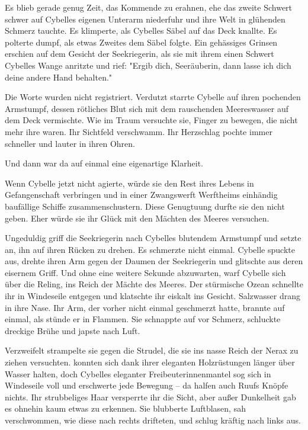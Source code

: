 Es blieb gerade genug Zeit, das Kommende zu erahnen, ehe das zweite Schwert schwer auf Cybelles eigenen Unterarm niederfuhr und ihre Welt in glühenden Schmerz tauchte. Es klimperte, als Cybelles Säbel auf das Deck knallte. Es polterte dumpf, als etwas Zweites dem Säbel folgte. Ein gehässiges Grinsen erschien auf dem Gesicht der Seekriegerin, als sie mit ihrem einen Schwert Cybelles Wange anritzte und rief: "Ergib dich, Seeräuberin, dann lasse ich dich deine andere Hand behalten."

Die Worte wurden nicht registriert. Verdutzt starrte Cybelle auf ihren pochenden Armstumpf, dessen rötliches Blut sich mit dem rauschenden Meereswasser auf dem Deck vermischte. Wie im Traum versuchte sie, Finger zu bewegen, die nicht mehr ihre waren. Ihr Sichtfeld verschwamm. Ihr Herzschlag pochte immer schneller und lauter in ihren Ohren.

Und dann war da auf einmal eine eigenartige Klarheit. 

Wenn Cybelle jetzt nicht agierte, würde sie den Rest ihres Lebens in Gefangenschaft verbringen und in einer Zwangswerft Werftheims einhändig baufällige Schiffe zusammenschustern. Diese Genugtuung durfte sie den  nicht geben. Eher würde sie ihr Glück mit den Mächten des Meeres versuchen.

Ungeduldig griff die Seekriegerin nach Cybelles blutendem Armstumpf und setzte an, ihn auf ihren Rücken zu drehen. Es schmerzte nicht einmal. Cybelle spuckte aus, drehte ihren Arm gegen der Daumen der Seekriegerin und glitschte aus deren eisernem Griff. Und ohne eine weitere Sekunde abzuwarten, warf Cybelle sich über die Reling, ins Reich der Mächte des Meeres. Der stürmische Ozean schnellte ihr in Windeseile entgegen und klatschte ihr eiskalt ins Gesicht. Salzwasser drang in ihre Nase. Ihr Arm, der vorher nicht einmal geschmerzt hatte, brannte auf einmal, als stünde er in Flammen. Sie schnappte auf vor Schmerz, schluckte dreckige Brühe und japste nach Luft. 

Verzweifelt strampelte sie gegen die Strudel, die sie ins nasse Reich der Nerax zu ziehen versuchten.  konnten sich dank ihrer eleganten Holzrüstungen länger über Wasser halten, doch Cybelles eleganter Freibeuterinnenmantel sog sich in Windeseile voll und erschwerte jede Bewegung – da halfen auch Ruufs Knöpfe nichts. Ihr strubbeliges Haar versperrte ihr die Sicht, aber außer Dunkelheit gab es ohnehin kaum etwas zu erkennen. Sie blubberte Luftblasen, sah verschwommen, wie diese nach rechts drifteten, und schlug kräftig nach links aus.

